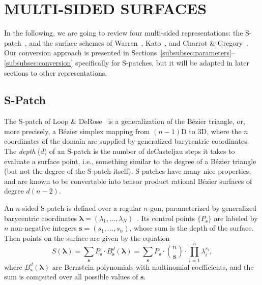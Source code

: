 \documentclass[9pt,academicons]{article}
\begin{document}
\section{MULTI-SIDED SURFACES}
\label{sec:multisided}
In the following, we are going to review four multi-sided representations:
the S-patch~\cite{Loop:1989}, and the surface schemes of Warren~\cite{Warren:1992},
Kato~\cite{Kato:1991}, and Charrot \& Gregory~\cite{Charrot:1984}.
Our conversion approach is presented in
Sections~\ref{subsubsec:parameters}--\ref{subsubsec:conversion}
specifically for S-patches, but it will be adapted in later sections to other representations.

\subsection{S-Patch}
\label{subsec:spatch}
The S-patch of Loop \& DeRose~\cite{Loop:1989} is a generalization of the B\'ezier triangle, or,
more precisely, a B\'ezier simplex mapping from $(n-1)$D to 3D, where the $n$ coordinates of the
domain are supplied by generalized barycentric coordinates. The \emph{depth} ($d$) of an S-patch
is the number of deCasteljau steps it takes to evaluate a surface point, i.e., something similar
to the degree of a B\'ezier triangle (but not the degree of the S-patch itself).
S-patches have many nice properties, and are known to be convertable into tensor product
rational B\'ezier surfaces of degree $d(n-2)$.

An $n$-sided S-patch is defined over a regular $n$-gon, parameterized by generalized
barycentric coordinates $\mathbf{\lambda}=(\lambda_1,\dots,\lambda_N)$~\cite{Hormann:2017}.
Its control
points $\{P_\mathbf{s}\}$ are labeled by $n$ non-negative integers $\mathbf{s}=(s_1,\dots,s_n)$,
whose sum is the depth of the surface. Then points on the surface are given by
the equation
\begin{equation}
  \label{eq:spatch}
  S(\mathbf{\lambda})=\sum_{\mathbf{s}}P_\mathbf{s}\cdot B_\mathbf{s}^d(\mathbf{\lambda})
  =\sum_{\mathbf{s}}P_\mathbf{s}\cdot {n\choose\mathbf{s}}\cdot\prod_{i=1}^n\lambda_i^{s_i},
\end{equation}
where $B_\mathbf{s}^d(\mathbf{\lambda})$ are Bernstein polynomials with multinomial coefficients,
and the sum is computed over all possible values of $\mathbf{s}$.
\end{document}
